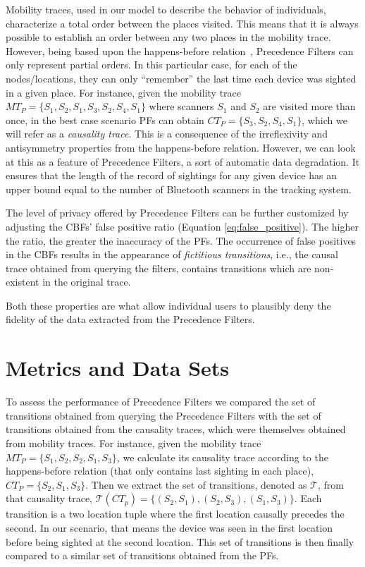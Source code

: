 Mobility traces, used in our model to describe the behavior of
individuals, characterize a total order between the places
visited. This means that it is always possible to establish an order
between any two places in the mobility trace. However, being based upon the
happens-before relation~\cite{Lamport:1978}, Precedence Filters can
only represent partial orders. In this particular case, for each of
the nodes/locations, they can only ``remember'' the last time each
device was sighted in a given place. For instance, given the mobility trace
$MT_{P}=\{S_1,S_2,S_1,S_3,S_2,S_4,S_1\}$ where scanners $S_1$ and $S_2$
are visited more than once, in the best case scenario PFs can obtain
$CT_{P}=\{S_3,S_2,S_4,S_1\}$, which we will refer as a \emph{causality
 trace}. This is a consequence of the irreflexivity and antisymmetry
properties from the happens-before relation. However, we can look at
this as a feature of Precedence Filters, a sort of automatic data
degradation. It ensures that the length of the record of sightings for any given
device has an upper bound equal to the number of Bluetooth scanners in
the tracking system.

The level of privacy offered by Precedence Filters can be further
customized by adjusting the CBFs' false positive ratio (Equation
\ref{eq:false_positive}). The higher the ratio, the greater the
inaccuracy of the PFs. The occurrence of false positives in the CBFs
results in the appearance of \emph{fictitious transitions}, i.e., the
causal trace obtained from querying the filters, contains transitions
which are non-existent in the original trace.

Both these properties are what allow individual users to plausibly deny the
fidelity of the data extracted from the Precedence Filters.

\section{Metrics and Data Sets}
\label{sec:metrics-data-sets}

To assess the performance of Precedence Filters we compared the set of
transitions obtained from querying the Precedence Filters with the set
of transitions obtained from the causality traces, which were
themselves obtained from mobility traces.  For instance, given the
mobility trace $MT_P=\{S_1,S_2,S_2,S_1,S_3\}$, we calculate its
causality trace according to the happens-before relation (that only
contains last sighting in each place), $CT_P=\{S_2,S_1,S_3\}$. Then we
extract the set of transitions, denoted as $\mathcal{T}$, from that causality trace,
$\mathcal{T}(CT_p)=\{(S_2,S_1),(S_2,S_3),(S_1,S_3)\}$. Each transition is a two location
tuple where the first location causally precedes the second. In our
scenario, that means the device was seen in the first location before
being sighted at the second location. This set of transitions is then
finally compared to a similar set of transitions obtained from the PFs.


